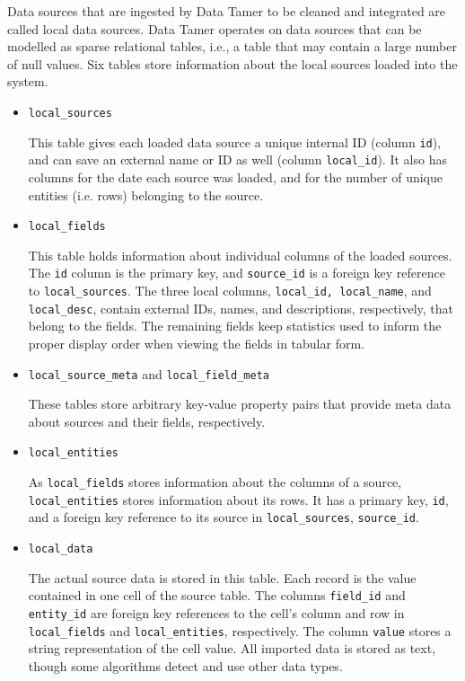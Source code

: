 \documentclass[12pt]{article}
\begin{document}
Data sources that are ingested by Data Tamer to be cleaned and integrated are called local data sources.  Data Tamer operates on data sources that can be modelled as sparse relational tables, i.e., a table that may contain a large number of null values.  Six tables store information about the local sources loaded into the system.

\begin{itemize}

\item \texttt{local\_sources}

This table gives each loaded data source a unique internal ID (column \texttt{id}), and can save an external name or ID as well (column \texttt{local\_id}).  It also has columns for the date each source was loaded, and for the number of unique entities (i.e. rows) belonging to the source.

\item \texttt{local\_fields}

This table holds information about individual columns of the loaded sources.  The \texttt{id} column is the primary key, and \texttt{source\_id} is a foreign key reference to \texttt{local\_sources}.  The three local columns, \texttt{local\_id, local\_name}, and \texttt{local\_desc}, contain external IDs, names, and descriptions, respectively, that belong to the fields.  The remaining fields keep statistics used to inform the proper display order when viewing the fields in tabular form.

\item \texttt{local\_source\_meta} and \texttt{local\_field\_meta}

These tables store arbitrary key-value property pairs that provide meta data about sources and their fields, respectively.

\item \texttt{local\_entities}

As \texttt{local\_fields} stores information about the columns of a source, \texttt{local\_entities} stores information about its rows.  It has a primary key, \texttt{id}, and a foreign key reference to its source in \texttt{local\_sources}, \texttt{source\_id}.

\item \texttt{local\_data}

The actual source data is stored in this table.  Each record is the value contained in one cell of the source table.  The columns \texttt{field\_id} and \texttt{entity\_id} are foreign key references to the cell's column and row in \texttt{local\_fields} and \texttt{local\_entities}, respectively.  The column \texttt{value} stores a string representation of the cell value.  All imported data is stored as text, though some algorithms detect and use other data types.

\end{itemize}
\end{document}
